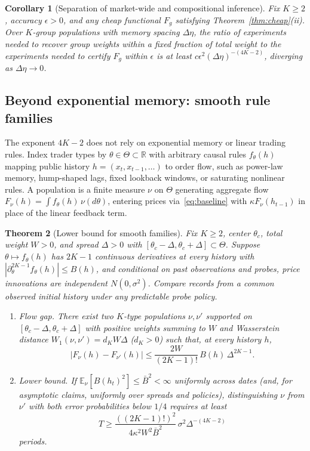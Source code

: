 \documentclass[11pt,letterpaper]{article}
\newtheorem{theorem}{Theorem}[section]
\newtheorem{corollary}[theorem]{Corollary}
\theoremstyle{definition}
\newcommand{\E}{\mathbb{E}}
\newcommand{\R}{\mathbb{R}}
\begin{document}
\begin{corollary}[Separation of market-wide and compositional inference]\label{cor:sep}
Fix $K \ge 2$, accuracy $\epsilon > 0$, and any cheap functional $F_g$ satisfying Theorem~\ref{thm:cheap}(ii). Over $K$-group populations with memory spacing $\Delta\eta$, the ratio of experiments needed to recover group weights within a fixed fraction of total weight to the experiments needed to certify $F_g$ within $\epsilon$ is at least $c \epsilon^2 (\Delta\eta)^{-(4K-2)}$, diverging as $\Delta\eta \to 0$.
\end{corollary}

\subsection{Beyond exponential memory: smooth rule families}

The exponent $4K-2$ does not rely on exponential memory or linear trading rules. Index trader types by $\theta \in \Theta \subset \R$ with arbitrary causal rules $f_\theta(h)$ mapping public history $h = (x_t, x_{t-1}, \dots)$ to order flow, such as power-law memory, hump-shaped lags, fixed lookback windows, or saturating nonlinear rules. A population is a finite measure $\nu$ on $\Theta$ generating aggregate flow $F_\nu(h) = \int f_\theta(h)\, \nu(d\theta)$, entering prices via~\eqref{eq:baseline} with $\kappa F_\nu(h_{t-1})$ in place of the linear feedback term.

\begin{theorem}[Lower bound for smooth families]\label{thm:smooth}
Fix $K \ge 2$, center $\theta_c$, total weight $W > 0$, and spread $\Delta > 0$ with $[\theta_c - \Delta, \theta_c + \Delta] \subset \Theta$. Suppose $\theta \mapsto f_\theta(h)$ has $2K-1$ continuous derivatives at every history with $|\partial_\theta^{2K-1} f_\theta(h)| \le B(h)$, and conditional on past observations and probes, price innovations are independent $N(0, \sigma^2)$. Compare records from a common observed initial history under any predictable probe policy.
\begin{enumerate}
  \item[(i)] \emph{Flow gap.} There exist two $K$-type populations $\nu, \nu'$ supported on $[\theta_c - \Delta, \theta_c + \Delta]$ with positive weights summing to $W$ and Wasserstein distance $W_1(\nu, \nu') = d_K W \Delta$ ($d_K > 0$) such that, at every history $h$,
  \[
    |F_\nu(h) - F_{\nu'}(h)| \le \frac{2W}{(2K-1)!}\, B(h)\, \Delta^{2K-1}.
  \]
  \item[(ii)] \emph{Lower bound.} If $\E_\nu[B(h_t)^2] \le \bar{B}^2 < \infty$ uniformly across dates (and, for asymptotic claims, uniformly over spreads and policies), distinguishing $\nu$ from $\nu'$ with both error probabilities below $1/4$ requires at least
  \[
    T \ge \frac{((2K-1)!)^2}{4 \kappa^2 W^2 \bar{B}^2}\, \sigma^2 \Delta^{-(4K-2)}
  \]
  periods.
\end{enumerate}
\end{theorem}
\end{document}
